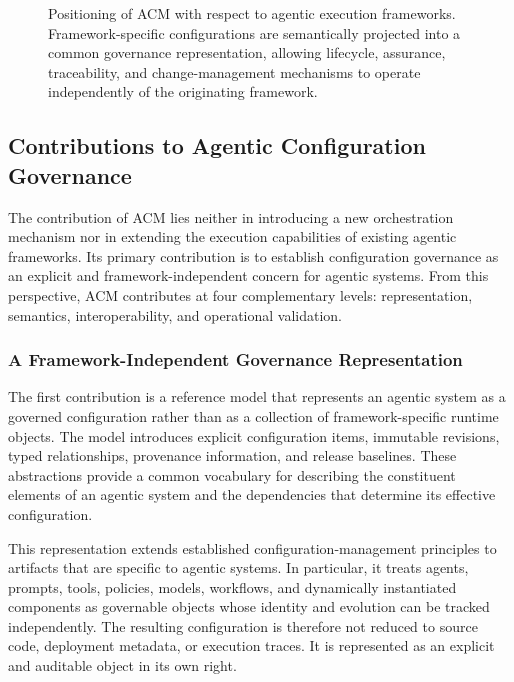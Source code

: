 \documentclass[10pt]{article}
\begin{document}
\begin{figure}[t]

    \caption{Positioning of ACM with respect to agentic execution frameworks. Framework-specific configurations are semantically projected into a common governance representation, allowing lifecycle, assurance, traceability, and change-management mechanisms to operate independently of the originating framework.}
    \label{fig:acm_framework_positioning}
\end{figure}

\subsection{Contributions to Agentic Configuration Governance}
\label{sec:governance_contributions}

The contribution of ACM lies neither in introducing a new orchestration mechanism nor in extending the execution capabilities of existing agentic frameworks. Its primary contribution is to establish configuration governance as an explicit and framework-independent concern for agentic systems. From this perspective, ACM contributes at four complementary levels: representation, semantics, interoperability, and operational validation.

\subsubsection{A Framework-Independent Governance Representation}

The first contribution is a reference model that represents an agentic system as a governed configuration rather than as a collection of framework-specific runtime objects. The model introduces explicit configuration items, immutable revisions, typed relationships, provenance information, and release baselines. These abstractions provide a common vocabulary for describing the constituent elements of an agentic system and the dependencies that determine its effective configuration.

This representation extends established configuration-management principles to artifacts that are specific to agentic systems. In particular, it treats agents, prompts, tools, policies, models, workflows, and dynamically instantiated components as governable objects whose identity and evolution can be tracked independently. The resulting configuration is therefore not reduced to source code, deployment metadata, or execution traces. It is represented as an explicit and auditable object in its own right.
\end{document}
